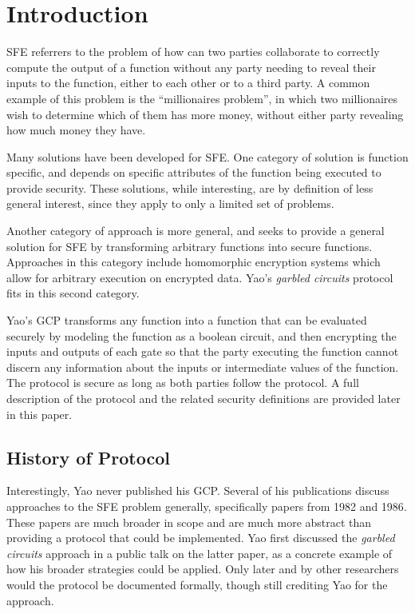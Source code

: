 \section{Introduction}
\label{sec:intro}

\ac{SFE} referrers to the problem of how can two parties collaborate to correctly compute the output of a function without any party needing to reveal their inputs to the function, either to each other or to a third party.  A common example of this problem is the ``millionaires problem'', in which two millionaires wish to determine which of them has more money, without either party revealing how much money they have\cite{yao1982protocols}.

Many solutions have been developed for \ac{SFE}. One category of solution is function specific, and depends on specific attributes of the function being executed to provide security\cite{huang2011faster}.  These solutions, while interesting, are by definition of less general interest, since they apply to only a limited set of problems.

Another category of approach is more general, and seeks to provide a general solution for \ac{SFE} by transforming arbitrary functions into secure functions. Approaches in this category include homomorphic encryption systems\cite{gentry2009fully} which allow for arbitrary execution on encrypted data.  Yao's \emph{garbled circuits} protocol fits in this second category.

Yao's \ac{GCP} transforms any function into a function that can be evaluated securely by modeling the function as a boolean circuit, and then encrypting the inputs and outputs of each gate so that the party executing the function cannot discern any information about the inputs or intermediate values of the function. The protocol is secure as long as both parties follow the protocol. A full description of the protocol and the related security definitions are provided later in this paper.

\subsection{History of Protocol}

Interestingly, Yao never published his \ac{GCP}. Several of his publications discuss approaches to the \ac{SFE} problem generally, specifically papers from 1982\cite{yao1982protocols} and 1986\cite{yao1986generate}. These papers are much broader in scope and are much more abstract than providing a protocol that could be implemented. Yao first discussed the \emph{garbled circuits} approach in a public talk on the latter paper, as a concrete example of how his broader strategies could be applied\cite{bellare2012foundations}. Only later and by other researchers would the protocol be documented formally\cite{goldreich1987play}, though still crediting Yao for the approach.

